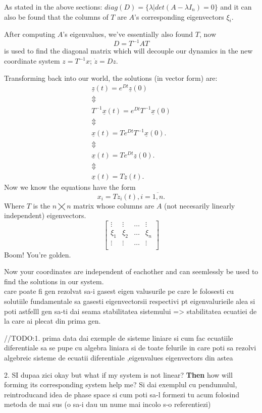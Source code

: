 As stated in the above sections: $diag(D) = \{ \lambda | det(A - \lambda I_n) = 0 \}$ and it can also be found that the columns of $T$ are $A$'s corresponding eigenvectors $\xi_i$.

After computing $A$'s eigenvalues, we've essentially also found $T$, now
\[
  D = T^{-1} A T
\]
is used to find the diagonal matrix which will decouple our dynamics in the new coordinate system $z = T^{-1} x$; $\dot{z} = D z$.

Transforming back into our world, the solutions (in vector form) are:
\begin{gather*}
  \underline{z}(t) = e^{Dt}\underline{z}(0) \\
  \Updownarrow \\
  T^{-1} \underline{x}(t) = e^{Dt} T^{-1} \underline{x}(0) \\
  \Updownarrow \\
  \underline{x}(t) = T e^{Dt} T^{-1} \underline{x}(0). \\
  \Updownarrow \\
  \underline{x}(t) = T e^{Dt} \underline{z}(0). \\
  \Updownarrow \\
  \underline{x}(t) = T \underline{z}(t).
\end{gather*}
Now we know the equations have the form
\[
  x_i = T z_i(t), i = \overline{1,n}.
\]
Where $T$ is the $n \bigtimes n$ matrix whose columns are $A$ (not necesarily linearly independent) eigenvectors.
\begin{equation*}
  \begin{bmatrix*}
    \vdots & \vdots & \dots & \vdots \\
    \xi_1 & \xi_2 & \dots & \xi_n \\
    \vdots & \vdots & \dots & \vdots \\
  \end{bmatrix*}
\end{equation*}
Boom! You're golden.

Now your coordinates are independent of eachother and can seemlessly be used to find the solutions in our system.
\\

care poate fi gen rezolvat sa-i gasest eigen valusurile pe care le folosesti cu solutiile fundamentale sa gasesti eigenvectorsii respectivi pt eigenvalurieile alea si poti astfelll gen sa-ti dai seama stabilitatea sistemului => stabilitatea ecuatiei de la care ai plecat din prima gen.

//TODO:1. prima data dai exemple de sisteme liniare si cum fac ecuatiile diferentiale sa se pupe cu algebra liniara si de toate felurile in care poti sa rezolvi algebreic sisteme de ecuatii diferentiale ,eigenvalues eigenvectors din astea \par
2. SI dupaa zici okay but what if my system is not linear? \textbf{Then} how will forming its corresponding system help me? Si dai exemplul cu pendumulul, reintroducand idea de phase space si cum poti sa-l formezi tu acum folosind metoda de mai sus (o sa-i dau un nume mai incolo s-o referentiezi)

